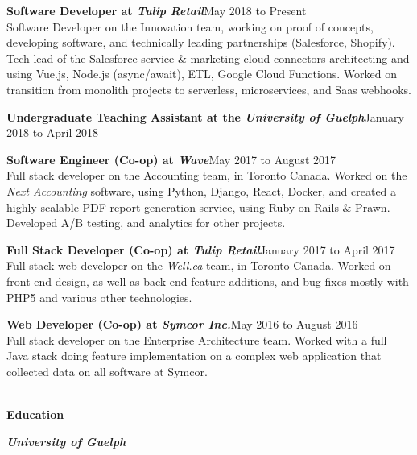 \documentclass[9pt]{extarticle}
\begin{document}
{    \textbf{{\firamedium Software Developer at \textit{Tulip Retail}}}{\color{darkgrey}\hfill{\small{May 2018 to Present\\[5pt]}}
        Software Developer on the Innovation team, working on proof of concepts, developing software, and technically leading partnerships (Salesforce, Shopify). Tech lead of the Salesforce service \& marketing cloud connectors architecting and using Vue.js, Node.js (async/await), ETL, Google Cloud Functions. Worked on transition from monolith projects to serverless, microservices, and Saas webhooks.
    }

    \textbf{{\firamedium Undergraduate Teaching Assistant at the \textit{University of Guelph}}}{\color{darkgrey}\hfill{\small{January 2018 to April 2018}}
    }

    \textbf{{\firamedium Software Engineer (Co-op) at \textit{Wave}}}{\color{darkgrey}\hfill{\small{May 2017 to August 2017\\[5pt]}}
        Full stack developer on the Accounting team, in Toronto Canada. Worked on the \textit{Next Accounting} software, using Python, Django, React, Docker, and created a highly scalable PDF report generation service, using Ruby on Rails \& Prawn. Developed A/B testing, and analytics for other projects.\\
    }

    \textbf{{\firamedium Full Stack Developer (Co-op) at \textit{Tulip Retail}}}{\color{darkgrey}\hfill{\small{January 2017 to April 2017\\[5pt]}}
        Full stack web developer on the \textit{Well.ca} team, in Toronto Canada. Worked on front-end design, as well as back-end feature additions, and bug fixes mostly with PHP5 and various other technologies. \\
    }

    \textbf{{\firamedium Web Developer (Co-op) at \textit{Symcor Inc.}}}{\color{darkgrey}\hfill{\small{May 2016 to August 2016\\[5pt]}}
        Full stack developer on the Enterprise Architecture team. Worked with a full Java stack doing feature implementation on a complex web application that collected data on all software at Symcor. \\
    }
    {\color{lightgrey}{\centerline{\rule{17cm}{0.4pt}}}}
    \begin{Large}
        \color{em-light}\textbf{\\[-5pt]{\firamedium Education}\\[-5pt]}
    \end{Large}

    \textit{\textbf{{\firamedium University of Guelph}}}{}
}
\end{document}
